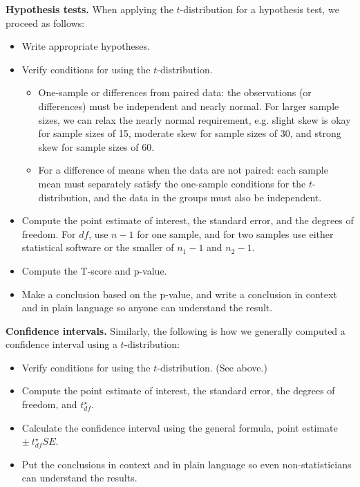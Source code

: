 {\textbf{Hypothesis tests.} When applying the $t$-distribution for a hypothesis test, we proceed as follows:
\begin{itemize}
\setlength{\itemsep}{0mm}
\item Write appropriate hypotheses.
\item Verify conditions for using the $t$-distribution.
\begin{itemize}
\item One-sample or differences from paired data: the observations (or differences) must be independent and nearly normal. For larger sample sizes, we can relax the nearly normal requirement, e.g. slight skew is okay for sample sizes of 15, moderate skew for sample sizes of 30, and strong skew for sample sizes of 60.
\item For a difference of means when the data are not paired: each sample mean must separately satisfy the one-sample conditions for the $t$-distribution, and the data in the groups must also be independent.
\end{itemize}
\item Compute the point estimate of interest, the standard error, and the degrees of freedom. For $df$, use $n-1$ for one sample, and for two samples use either statistical software or the smaller of $n_1 - 1$ and $n_2 - 1$.
\item Compute the T-score and p-value.
\item Make a conclusion based on the p-value, and write a conclusion in context and in plain language so anyone can understand the result.
\end{itemize}
\noindent\textbf{Confidence intervals.} Similarly, the following is how we generally computed a confidence interval using a $t$-distribution:
\begin{itemize}
\item Verify conditions for using the $t$-distribution. (See above.)
\item Compute the point estimate of interest, the standard error, the degrees of freedom, and $t^{\star}_{df}$.
\item Calculate the confidence interval using the general formula, point estimate $\pm\ t_{df}^{\star} SE$.
\item Put the conclusions in context and in plain language so even non-statisticians can understand the results.
\end{itemize}



}
